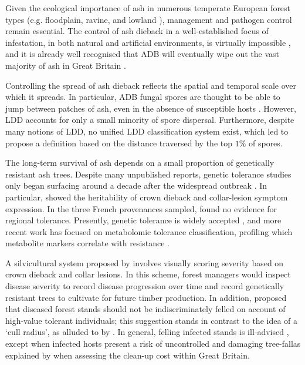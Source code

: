 Given the ecological importance of ash in numerous temperate European forest types (e.g. floodplain, ravine, 
and lowland \cite{dobrowolska2011review}), management and pathogen control remain essential. The control of ash dieback
in a well-established focus of infestation, in both natural and artificial environments, is virtually impossible
\cite{havrdova2017environmental}, and it is already well recognised that ADB will eventually wipe out the vast 
majority of ash in Great Britain \cite{ash-dieback-costs}.

Controlling the spread of ash dieback reflects the spatial and temporal scale over which it spreads.
In particular, ADB fungal spores are thought to be able to jump between patches of ash,
even in the absence of susceptible hosts \cite{wingen2013long}.
However, LDD accounts for only a small minority of spore dispersal.
Furthermore, despite many notions of LDD, no unified LDD classification system exist, 
which led \cite{golan2017long} to propose a definition based on the distance traversed by the top $1\%$ of spores.

The long-term survival of ash depends on a small proportion of genetically resistant ash trees.
Despite many unpublished reports, genetic tolerance studies only began surfacing around a decade
after the widespread outbreak \cite{kjaer2012adaptive, stener2013clonal, mckinney2014ash}.
In particular, \cite{doi:10.1094/PHYTO-11-15-0284-R} showed the heritability of crown dieback and
collar-lesion symptom expression. In the three French provenances sampled,
\cite{doi:10.1094/PHYTO-11-15-0284-R} found no evidence for regional tolerance.
Presently, genetic tolerance is widely accepted \cite{havrdova2016differences, skovsgaard2017silvicultural},
and more recent work has focused on metabolomic tolerance classification,
profiling which metabolite markers correlate with resistance 
\cite{nemesio2020canditate, nemesio2020metabolomics, sidda2020diversity, chaudhary2020identification}.

A silvicultural system proposed by \cite{skovsgaard2017silvicultural} involves visually scoring severity based on crown dieback
and collar lesions. In this scheme, forest managers would inspect disease severity to record disease progression over time
and record genetically resistant trees to cultivate for future timber production. In addition, 
\cite{skovsgaard2017silvicultural} proposed that diseased forest stands should not be indiscriminately felled on account of high-value
tolerant individuals; this suggestion stands in contrast to the idea of a `cull radius', as alluded to by \cite{WEBIDEMICS}. 
In general, felling infected stands is ill-advised  \cite{chandelier2017ash}, except when infected hosts present a risk of uncontrolled 
and damaging tree-fall\textemdash as explained by \cite{ash-dieback-costs} when assessing the clean-up cost within Great Britain.

